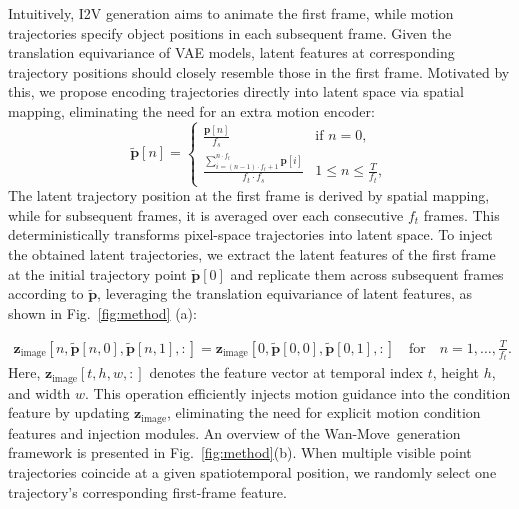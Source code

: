 \documentclass{article}
\newcommand{\method}{Wan-Move}
\begin{document}
Intuitively, I2V generation aims to animate the first frame, while motion trajectories specify object positions in each subsequent frame.
Given the translation equivariance of VAE models, latent features at corresponding trajectory positions should closely resemble those in the first frame.
Motivated by this, we propose encoding trajectories directly into latent space via spatial mapping, eliminating the need for an extra motion encoder:
\begin{equation}
    \tilde{\mathbf{p}}[n] = 
    \begin{cases}
        \frac{\mathbf{p}[n]}{f_s} & \text{if } n = 0, \\
        \frac{\sum_{i=(n-1)\cdot f_t +1}^{n\cdot f_t} \mathbf{p}[i]}{f_t \cdot f_s} & 1\leq n \leq \frac{T}{f_t},
    \end{cases}
\end{equation}
The latent trajectory position at the first frame is derived by spatial mapping, while for subsequent frames, it is averaged over each consecutive $f_t$ frames.
This deterministically transforms pixel-space trajectories into latent space.
To inject the obtained latent trajectories, we extract the latent features of the first frame at the initial trajectory point $\tilde{\mathbf{p}}[0]$ and replicate them across subsequent frames according to $\tilde{\mathbf{p}}$, leveraging the translation equivariance of latent features, as shown in Fig.~\ref{fig:method} (a):

\begin{align} \label{eq:feature_propagate}
    \mathbf{z}_{\text{image}}\left[n, \tilde{\mathbf{p}}[n,0], \tilde{\mathbf{p}}[n,1], :\right] = \mathbf{z}_{\text{image}}\left[0, \tilde{\mathbf{p}}[0,0], \tilde{\mathbf{p}}[0,1], :\right] \quad \text{for} \quad n = 1,\ldots,\frac{T}{f_t}.
\end{align}
Here, $\mathbf{z}_{\text{image}}[t, h, w, :]$ denotes the feature vector at temporal index $t$, height $h$, and width $w$. 
This operation efficiently injects motion guidance into the condition feature by updating $\mathbf{z}_{\text{image}}$, eliminating the need for explicit motion condition features and injection modules. An overview of the \method~generation framework is presented in Fig.~\ref{fig:method}(b).
When multiple visible point trajectories coincide at a given spatiotemporal position, we randomly select one trajectory's corresponding first-frame feature.
\end{document}

